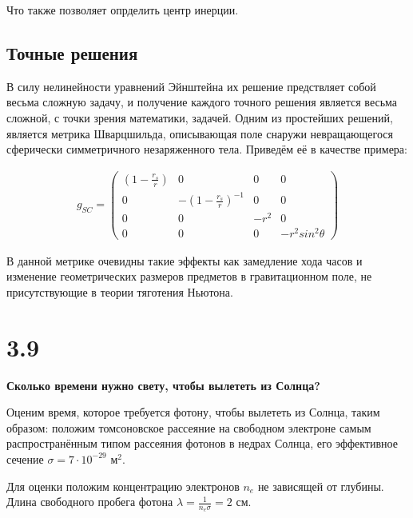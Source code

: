 \documentclass[a4paper,14pt]{article}
\begin{document}
	Что также позволяет опрделить центр инерции.

\subsection*{Точные решения}

	В силу нелинейности уравнений Эйнштейна их решение предствляет собой весьма сложную задачу, и получение каждого точного решения является весьма сложной, с точки зрения математики, задачей. Одним из простейших решений, является метрика Шварцшильда, описывающая поле снаружи невращающегося сферически симметричного незаряженного тела. Приведём её в качестве примера:

	\begin{align*}
		g_{SC} =
		\left( \begin{array}{cccc}
			(1-\frac{r_s}{r}) & 0                       & 0    & 0                \\
			0                 & -(1-\frac{r_s}{r})^{-1} & 0    & 0                \\
			0                 & 0                       & -r^2 & 0                \\
			0                 & 0                       & 0    & -r^2 sin^2 \theta 
		\end{array} \right)
	\end{align*}

	В данной метрике очевидны такие эффекты как замедление хода часов и изменение геометрических размеров предметов в гравитационном поле, не присутствующие в теории тяготения Ньютона. 


\section*{3.9}

\begin{center}
	\LARGE{\textbf{Сколько времени нужно свету, чтобы вылететь из Солнца?}}\\
\end{center}

Оценим время, которое требуется фотону, чтобы вылететь из Солнца, таким образом: положим томсоновское рассеяние на свободном электроне самым распространённым типом рассеяния фотонов в недрах Солнца, его эффективное сечение $\sigma = 7 \cdot 10^{-29} \text{ м}^2$.

Для оценки положим концентрацию электронов $n_e$ не зависящей от глубины. Длина свободного пробега фотона $\lambda = \frac{1}{n_e \sigma} = 2 \text{ см}$.
\end{document}

